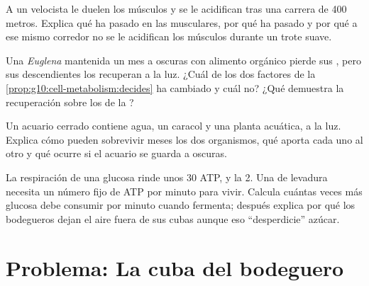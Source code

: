 \begin{exercise}[$\star\star\star$]\label{exo:g10:cell-metabolism:12}
A un velocista le duelen los músculos y se le acidifican tras una
carrera de 400 metros. Explica qué ha pasado en las 
musculares, por qué ha pasado y por qué a ese mismo corredor no se le
acidifican los músculos durante un trote suave.
\end{exercise}

\begin{exercise}[$\star\star\star$]\label{exo:g10:cell-metabolism:13}
Una \emph{Euglena} mantenida un mes a oscuras con alimento orgánico
pierde sus , pero sus descendientes los recuperan a la luz.
¿Cuál de los dos factores de la
\cref{prop:g10:cell-metabolism:decides} ha cambiado y cuál no? ¿Qué
demuestra la recuperación sobre los  de la ?
\end{exercise}

\begin{exercise}[$\star\star\star$]\label{exo:g10:cell-metabolism:14}
Un acuario cerrado contiene agua, un caracol y una planta acuática, a
la luz. Explica cómo pueden sobrevivir meses los dos organismos, qué
aporta cada uno al otro y qué ocurre si el acuario se guarda a
oscuras.
\end{exercise}

\begin{exercise}[$\star\star\star$]\label{exo:g10:cell-metabolism:15}
La respiración de una glucosa rinde unos 30 ATP, y la  2.
Una  de levadura necesita un número fijo de ATP por minuto para
vivir. Calcula cuántas veces más glucosa debe consumir por minuto
cuando fermenta; después explica por qué los bodegueros dejan el aire
fuera de sus cubas aunque eso ``desperdicie'' azúcar.
\end{exercise}

\section{Problema: La cuba del bodeguero}

